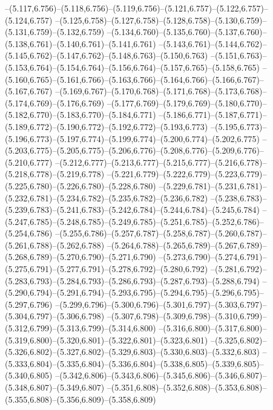   --(5.117,6.756)--(5.118,6.756)--(5.119,6.756)--(5.121,6.757)--(5.122,6.757)--(5.124,6.757)%
  --(5.125,6.758)--(5.127,6.758)--(5.128,6.758)--(5.130,6.759)--(5.131,6.759)--(5.132,6.759)%
  --(5.134,6.760)--(5.135,6.760)--(5.137,6.760)--(5.138,6.761)--(5.140,6.761)--(5.141,6.761)%
  --(5.143,6.761)--(5.144,6.762)--(5.145,6.762)--(5.147,6.762)--(5.148,6.763)--(5.150,6.763)%
  --(5.151,6.763)--(5.153,6.764)--(5.154,6.764)--(5.156,6.764)--(5.157,6.765)--(5.158,6.765)%
  --(5.160,6.765)--(5.161,6.766)--(5.163,6.766)--(5.164,6.766)--(5.166,6.767)--(5.167,6.767)%
  --(5.169,6.767)--(5.170,6.768)--(5.171,6.768)--(5.173,6.768)--(5.174,6.769)--(5.176,6.769)%
  --(5.177,6.769)--(5.179,6.769)--(5.180,6.770)--(5.182,6.770)--(5.183,6.770)--(5.184,6.771)%
  --(5.186,6.771)--(5.187,6.771)--(5.189,6.772)--(5.190,6.772)--(5.192,6.772)--(5.193,6.773)%
  --(5.195,6.773)--(5.196,6.773)--(5.197,6.774)--(5.199,6.774)--(5.200,6.774)--(5.202,6.775)%
  --(5.203,6.775)--(5.205,6.775)--(5.206,6.776)--(5.208,6.776)--(5.209,6.776)--(5.210,6.777)%
  --(5.212,6.777)--(5.213,6.777)--(5.215,6.777)--(5.216,6.778)--(5.218,6.778)--(5.219,6.778)%
  --(5.221,6.779)--(5.222,6.779)--(5.223,6.779)--(5.225,6.780)--(5.226,6.780)--(5.228,6.780)%
  --(5.229,6.781)--(5.231,6.781)--(5.232,6.781)--(5.234,6.782)--(5.235,6.782)--(5.236,6.782)%
  --(5.238,6.783)--(5.239,6.783)--(5.241,6.783)--(5.242,6.784)--(5.244,6.784)--(5.245,6.784)%
  --(5.247,6.785)--(5.248,6.785)--(5.249,6.785)--(5.251,6.785)--(5.252,6.786)--(5.254,6.786)%
  --(5.255,6.786)--(5.257,6.787)--(5.258,6.787)--(5.260,6.787)--(5.261,6.788)--(5.262,6.788)%
  --(5.264,6.788)--(5.265,6.789)--(5.267,6.789)--(5.268,6.789)--(5.270,6.790)--(5.271,6.790)%
  --(5.273,6.790)--(5.274,6.791)--(5.275,6.791)--(5.277,6.791)--(5.278,6.792)--(5.280,6.792)%
  --(5.281,6.792)--(5.283,6.793)--(5.284,6.793)--(5.286,6.793)--(5.287,6.793)--(5.288,6.794)%
  --(5.290,6.794)--(5.291,6.794)--(5.293,6.795)--(5.294,6.795)--(5.296,6.795)--(5.297,6.796)%
  --(5.299,6.796)--(5.300,6.796)--(5.301,6.797)--(5.303,6.797)--(5.304,6.797)--(5.306,6.798)%
  --(5.307,6.798)--(5.309,6.798)--(5.310,6.799)--(5.312,6.799)--(5.313,6.799)--(5.314,6.800)%
  --(5.316,6.800)--(5.317,6.800)--(5.319,6.800)--(5.320,6.801)--(5.322,6.801)--(5.323,6.801)%
  --(5.325,6.802)--(5.326,6.802)--(5.327,6.802)--(5.329,6.803)--(5.330,6.803)--(5.332,6.803)%
  --(5.333,6.804)--(5.335,6.804)--(5.336,6.804)--(5.338,6.805)--(5.339,6.805)--(5.340,6.805)%
  --(5.342,6.806)--(5.343,6.806)--(5.345,6.806)--(5.346,6.807)--(5.348,6.807)--(5.349,6.807)%
  --(5.351,6.808)--(5.352,6.808)--(5.353,6.808)--(5.355,6.808)--(5.356,6.809)--(5.358,6.809)%

